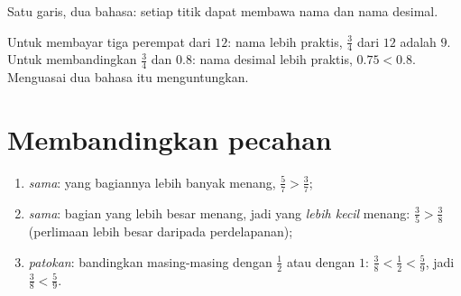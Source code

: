 \begin{omfigure}

{\small Satu garis, dua bahasa: setiap titik dapat membawa nama
 dan nama desimal.}
\end{omfigure}

\begin{example}\label{ex:g5:fractions:choose}
Untuk membayar tiga perempat dari $12$: nama  lebih praktis,
$\frac34$ dari $12$ adalah $9$. Untuk membandingkan $\frac34$ dan
$0.8$: nama desimal lebih praktis, $0.75 < 0.8$. Menguasai dua
bahasa itu menguntungkan.
\end{example}

\section{Membandingkan pecahan}

\begin{method}\label{met:g5:fractions:compare}
\begin{enumerate}
  \item \emph{ sama}: yang bagiannya lebih banyak menang,
        $\frac57 > \frac37$;
  \item \emph{ sama}: bagian yang lebih besar menang, jadi
         yang \emph{lebih kecil} menang: $\frac35 > \frac38$
        (perlimaan lebih besar daripada perdelapanan);
  \item \emph{patokan}: bandingkan masing-masing dengan $\frac12$
        atau dengan $1$: $\frac38 < \frac12 < \frac59$, jadi
        $\frac38 < \frac59$.
\end{enumerate}
\end{method}

